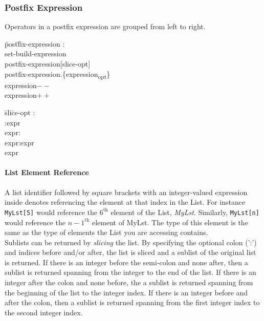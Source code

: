\documentclass{article}
\begin{document}
\subsubsection{Postfix Expression}
Operators in a postfix expression are grouped from left to right.
\begin{itshape}
\begin{tabbing}
	\= post\=fix-expression : \\
		\> \> set-build-expression \\
		\>\> postfix-expression[slice-opt] \\		
		\>\> postfix-expression.\{expression\textsubscript{opt}\}\\
		\> \> expression$--$ \\
		\> \> expression$++$ 
\end{tabbing}
\end{itshape}

\begin{itshape}
\begin{tabbing}
	\= sli\=ce-opt : \\
		\> \> :expr \\
		\> \> expr: \\
		\> \> expr:expr \\
		\> \> expr \\
\end{tabbing}
\end{itshape}


\paragraph{List Element Reference}
A list identifier followed by square brackets with an integer-valued expression inside denotes referencing the element at that index in the List. For instance \lstinline!MyLst[5]! would reference the $6^\mathrm{th}$ element of the List, \emph{MyLst}. Similarly, \lstinline!MyLst[n]! would reference the $n-1^\mathrm{th}$ element of MyLst. The type of this element is the same as the type of elements the List you are accessing contains. \\
Sublists can be returned by \emph{slicing} the list. By specifying the optional colon (':') and indices before and/or after, the list is sliced and a sublist of the original list is returned. If there is an integer before the semi-colon and none after, then a sublist is returned spanning from the integer to the end of the list. If there is an integer after the colon and none before, the a sublist is returned spanning from the beginning of the list to the integer index. If there is an integer before and after the colon, then a sublist is returned spanning from the first integer index to the second integer index.
\end{document}
